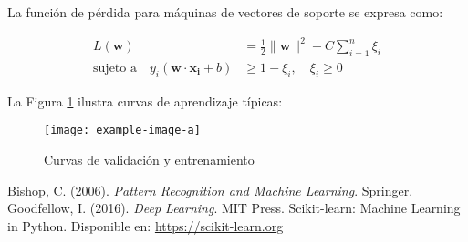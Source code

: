 \documentclass[12pt,a4paper]{article}
\begin{document}
La función de pérdida para máquinas de vectores de soporte se expresa como:

\begin{align}
L(\mathbf{w}) &= \frac{1}{2}\|\mathbf{w}\|^2 + C\sum_{i=1}^n \xi_i \\
\text{sujeto a} \quad y_i(\mathbf{w}\cdot\mathbf{x_i} + b) &\geq 1 - \xi_i, \quad \xi_i \geq 0
\end{align}

La Figura \ref{fig:curvas} ilustra curvas de aprendizaje típicas:

\begin{figure}[H]
\centering
\texttt{[image: example-image-a]}
\caption{Curvas de validación y entrenamiento}
\label{fig:curvas}
\end{figure}

\lipsum[4-7]

\begin{thebibliography}{9}
 Bishop, C. (2006). \textit{Pattern Recognition and Machine Learning}. Springer.
 Goodfellow, I. (2016). \textit{Deep Learning}. MIT Press.
 Scikit-learn: Machine Learning in Python. Disponible en: \url{https://scikit-learn.org}
\end{thebibliography}
\end{document}
